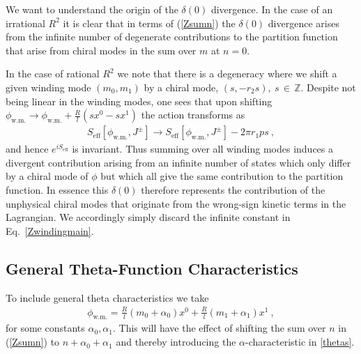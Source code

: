 \documentclass[11pt]{article}
\numberwithin{equation}{section}
\begin{document}
\begin{appendix}
We want to understand the origin of the $\delta(0)$ divergence. 
In the case of an irrational $R^2$  it is clear that in terms of (\ref{Zsumn}) the $\delta(0)$ divergence arises from the infinite number of degenerate contributions to the partition function that  arise from chiral modes in the sum over $m$ at $n=0$.

In the case of rational $R^2$  we note that there is a  degeneracy where we shift a given winding mode $(m_0, m_1)$ by a chiral mode, $(s,- r_2 s), \ s \, \in \, \mathbb{Z}$. Despite  not being linear in the winding modes, one sees that upon shifting $\phi_{\text{w.m.}}\to \phi_{\text{w.m.}}+ \frac{R}{l}(s x^0-s x^1)$ the action transforms as
 \begin{align}
 S_{\text{eff}}[\phi_{\text{w.m.}},J^\pm]\to S_{\text{eff}}[\phi_{\text{w.m.}},J^\pm] - 2\pi r_1 p s\ ,
 \end{align}
 and hence $e^{i S_{\text{eff}}}$ is invariant. Thus summing over all winding modes induces a divergent contribution arising from an infinite number of states which only differ by a  chiral mode of $\phi$ but which all give the same contribution to the partition function. In essence this $\delta(0)$ therefore represents the contribution of the unphysical chiral modes that originate from the wrong-sign kinetic terms in the Lagrangian. We accordingly simply discard the infinite constant in Eq.~\eqref{Zwindingmain}. 


\subsection{General Theta-Function Characteristics}\label{app:general}

To include general theta characteristics we take
\begin{align}
\phi_{\text{w.m.}} = \frac{R}{l}(m_0+\alpha_0)x^0 + 	\frac{R}{l}(m_1+\alpha_1)x^1\ ,
\end{align}
for some constants $\alpha_0,\alpha_1$. This will have the effect of shifting the sum over $n$ in (\ref{Zsumn}) to $n+\alpha_0+\alpha_1$  and thereby introducing the $\alpha$-characteristic in \eqref{thetas}.


\end{appendix}
\end{document}
